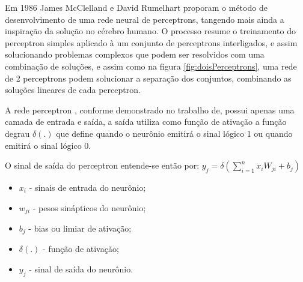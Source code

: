 	  	    Em 1986 James McClelland e David Rumelhart proporam o método de desenvolvimento de uma rede neural de perceptrons, tangendo mais ainda a inspiração da solução no cérebro humano. O processo resume o treinamento do perceptron simples aplicado à um conjunto de perceptrons interligados, e assim solucionando problemas complexos que podem ser resolvidos com uma combinação de soluções, e assim como na figura \ref{fig:doisPerceptrons}, uma rede de 2 perceptrons podem solucionar a separação dos conjuntos, combinando as soluções lineares de cada perceptron.
	  	  
  	  	  \begin{figure}[H]
  	  	   \end{figure}

            A rede perceptron , conforme demonstrado no trabalho de, possui apenas uma camada de entrada e saída, a saída utiliza como função de ativação a função degrau $ \delta(.) $ que define quando o neurônio emitirá o sinal lógico 1 ou quando emitirá o sinal lógico 0.

            O sinal de saída do perceptron entende-se então por:
            $y_j= \delta(\sum_{i=1}^{n}x_i W_{ji}+b_j)$
            \begin{itemize}
            	\item $ x_i $ - sinais de entrada do neurônio;
            	\item $ w_{ji} $ - pesos sinápticos do neurônio;
            	\item $ b_j $ - bias ou limiar de ativação;
            	\item $ \delta(.) $ - função de ativação;
            	\item $ y_j $ - sinal de saída do neurônio.
            \end{itemize}
			
